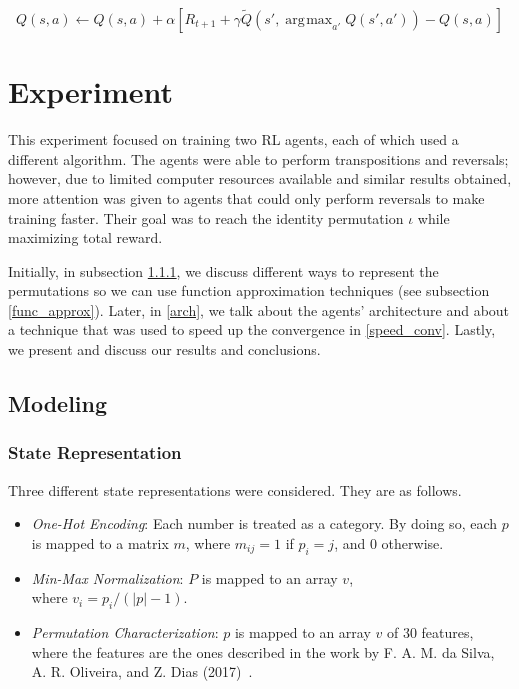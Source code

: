 \documentclass[11pt,twoside]{article}
\DeclareMathOperator*{\argmax}{\arg\!\max}
\begin{document}
\begin{equation}\label{double_equation}
	Q(s, a) \leftarrow Q(s, a) + \alpha [R_{t+1} + \gamma \widetilde{Q}(s', \argmax_{a'}{Q(s', a')}) - Q(s,a)]
\end{equation}


\section{Experiment}

This experiment focused on training two RL agents, each of which used a different algorithm. The agents were able to perform transpositions and reversals; however, due to limited computer resources available and similar results obtained, more attention was given to agents that could only perform reversals to make training faster. Their goal was to reach the identity permutation $\iota$ while maximizing total reward. 

Initially, in subsection \ref{state_rep}, we discuss different ways to represent the permutations so we can use function approximation techniques (see subsection \ref{func_approx}). Later, in \ref{arch}, we talk about the agents' architecture and about a technique that was used to speed up the convergence in \ref{speed_conv}. Lastly, we present and discuss our results and conclusions.

\subsection{Modeling}

\subsubsection{State Representation}\label{state_rep}

Three different state representations were considered. They are as follows.

\begin{itemize}
	\item \textit{One-Hot Encoding}: Each number is treated as a category. By doing so, each $p$ is mapped to a matrix $m$, where $m_{ij} = 1$ if $p_i = j$, and $0$ otherwise. 
	\item \textit{Min-Max Normalization}: $P$ is mapped to an array $v$,\\ where $v_i = p_i / (|p| - 1)$.
	\item \textit{Permutation Characterization}: $p$ is mapped to an array $v$ of $30$ features, where the features are the ones described in the work by F. A. M. da Silva, A. R. Oliveira, and Z. Dias (2017)~\cite{flavio}.
\end{itemize}
\end{document}
